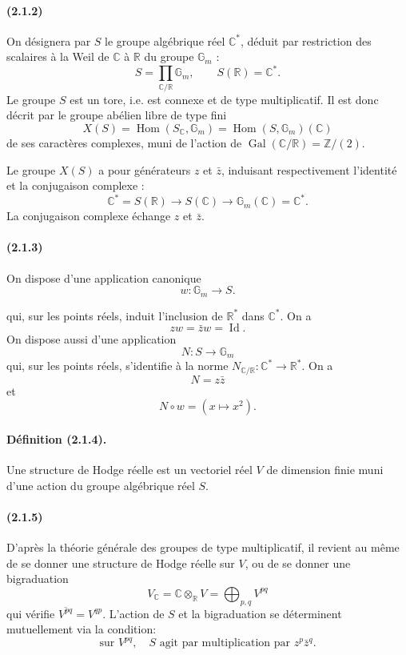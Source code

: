 \documentclass[10pt]{article}
\newcommand{\C}{\mathbb C}
\newcommand{\Z}{\mathbb Z}
\newcommand{\Hom}{\operatorname{Hom}}
\newcommand{\R}{\mathbb R}
\newcommand{\Gm}{\mathbb G_m}
\newcommand{\Gal}{\operatorname{Gal}}
\begin{document}
\paragraph{(2.1.2)} On désignera par $S$ le groupe algébrique réel $\C^*$, déduit par restriction des scalaires à la Weil de $\C$ à $\R$ du groupe $\Gm$ :
\[
S=\prod_{\C/\R}\Gm,
\qquad
S(\R)=\C^*.
\]
Le groupe $S$ est un tore, i.e. est connexe et de type multiplicatif. Il est donc décrit par le groupe abélien libre de type fini
\[
X(S)=\Hom(S_\C,\Gm)=\Hom(S,\Gm)(\C)
\]
de ses caractères complexes, muni de l'action de $\Gal(\C/\R)=\Z/(2)$.

Le groupe $X(S)$ a pour générateurs $z$ et $\bar z$, induisant respectivement l'identité et la conjugaison complexe :
\[
\C^*=S(\R)\longrightarrow S(\C)\longrightarrow \Gm(\C)=\C^*.
\]
La conjugaison complexe échange $z$ et $\bar z$.

\paragraph{(2.1.3)} On dispose d'une application canonique
\[
\tag{2.1.3.1}
w:\Gm\longrightarrow S.
\]




qui, sur les points réels, induit l'inclusion de $\R^*$ dans $\C^*$. On a
\[
\tag{2.1.3.2}
z w=\bar z w=\operatorname{Id}.
\]
On dispose aussi d'une application
\[
\tag{2.1.3.3}
N:S\longrightarrow\Gm
\]
qui, sur les points réels, s'identifie à la norme $N_{\C/\R}:\C^*\to\R^*$. On a
\[
\tag{2.1.3.4}
N=z\bar z
\]
et
\[
\tag{2.1.3.5}
N\circ w=(x\mapsto x^2).
\]

\paragraph{Définition (2.1.4).} Une structure de Hodge réelle est un vectoriel réel $V$ de dimension finie muni d'une action du groupe algébrique réel $S$.

\paragraph{(2.1.5)} D'après la théorie générale des groupes de type multiplicatif, il revient au même de se donner une structure de Hodge réelle sur $V$, ou de se donner une bigraduation
\[
V_\C=\C\otimes_\R V=\bigoplus_{p,q} V^{pq}
\]
qui vérifie $\overline{V^{pq}}=V^{qp}$. L'action de $S$ et la bigraduation se déterminent mutuellement via la condition:
\[
\tag{2.1.5.1}
\text{sur }V^{pq},\quad S\text{ agit par multiplication par }z^p\bar z^q.
\]
\end{document}
